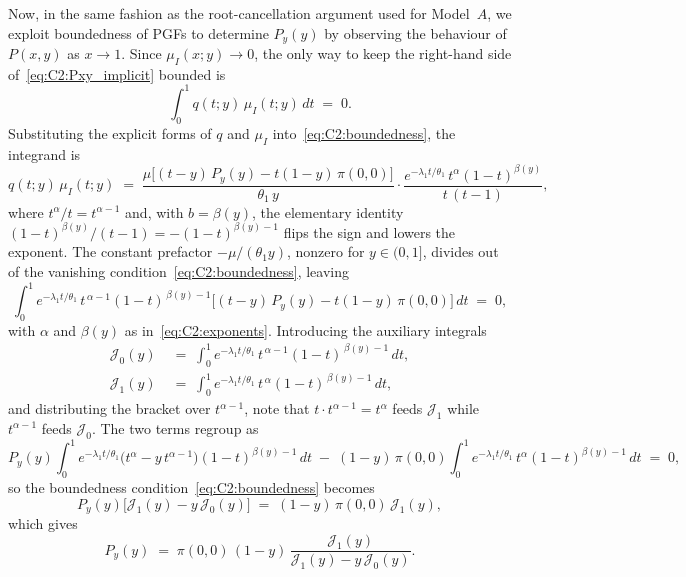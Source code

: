 Now, in the same fashion as the root-cancellation argument used for Model~$A$, we exploit boundedness of PGFs to determine $P_y(y)$ by observing the behaviour of $P(x,y)$ as $x\to 1$. Since $\mu_I(x;y)\to 0$, the only way to keep the right-hand side of~\eqref{eq:C2:Pxy_implicit} bounded is
\begin{equation}
    \int_0^1 q(t;y)\,\mu_I(t;y)\,dt \;=\; 0.
    \label{eq:C2:boundedness}
\end{equation}
Substituting the explicit forms of $q$ and $\mu_I$ into~\eqref{eq:C2:boundedness}, the integrand is
\begin{equation}
    q(t;y)\,\mu_I(t;y)
    \;=\; \frac{\mu\bigl[(t-y)\,P_y(y) - t(1-y)\,\pi(0,0)\bigr]}{\theta_1\,y}
    \cdot \frac{e^{-\lambda_1 t/\theta_1}\,t^{\alpha}(1-t)^{\beta(y)}}{t\,(t-1)},
    \label{eq:C2:integrand}
\end{equation}
where $t^{\alpha}/t = t^{\alpha-1}$ and, with $b=\beta(y)$, the elementary identity $(1-t)^{\beta(y)}/(t-1) = -(1-t)^{\beta(y)-1}$ flips the sign and lowers the exponent. The constant prefactor $-\mu/(\theta_1 y)$, nonzero for $y\in(0,1]$, divides out of the vanishing condition~\eqref{eq:C2:boundedness}, leaving
\begin{equation}
    \int_0^1 e^{-\lambda_1 t/\theta_1}\,t^{\,\alpha-1}(1-t)^{\,\beta(y)-1}\bigl[(t-y)\,P_y(y) - t(1-y)\,\pi(0,0)\bigr]\,dt \;=\; 0,
\end{equation}
with $\alpha$ and $\beta(y)$ as in~\eqref{eq:C2:exponents}. Introducing the auxiliary integrals
\begin{align}
    \mathcal{J}_0(y) &\;=\; \int_0^1 e^{-\lambda_1 t/\theta_1}\,t^{\,\alpha-1}(1-t)^{\,\beta(y)-1}\,dt, \\
    \mathcal{J}_1(y) &\;=\; \int_0^1 e^{-\lambda_1 t/\theta_1}\,t^{\,\alpha}(1-t)^{\,\beta(y)-1}\,dt,
\end{align}
and distributing the bracket over $t^{\alpha-1}$, note that $t\cdot t^{\alpha-1}=t^{\alpha}$ feeds $\mathcal{J}_1$ while $t^{\alpha-1}$ feeds $\mathcal{J}_0$. The two terms regroup as
\[
    P_y(y)\!\int_0^1\! e^{-\lambda_1 t/\theta_1}\bigl(t^{\alpha}-y\,t^{\alpha-1}\bigr)(1-t)^{\beta(y)-1}\,dt
    \;-\; (1-y)\,\pi(0,0)\!\int_0^1\! e^{-\lambda_1 t/\theta_1}\,t^{\alpha}(1-t)^{\beta(y)-1}\,dt \;=\;0,
\]
so the boundedness condition~\eqref{eq:C2:boundedness} becomes
\begin{equation}
    P_y(y)\bigl[\mathcal{J}_1(y) - y\,\mathcal{J}_0(y)\bigr] \;=\; (1-y)\,\pi(0,0)\,\mathcal{J}_1(y),
\end{equation}
which gives
\begin{equation}
    P_y(y) \;=\; \pi(0,0)\,(1-y)\,\frac{\mathcal{J}_1(y)}{\mathcal{J}_1(y) - y\,\mathcal{J}_0(y)}.
    \label{eq:C2:Py_anal_raw}
\end{equation}

